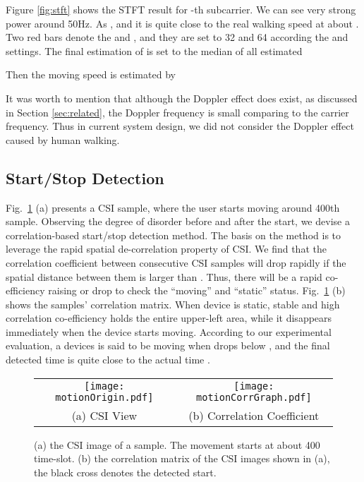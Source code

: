 Figure \ref{fig:stft} shows the STFT result for -th subcarrier.
We can see very strong power around
50Hz. As , and it is quite close to
 the real walking speed at about . Two red bars denote the
 and , and they are set to 32 and 64 according the
 and  settings.
The final estimation of  is set to the median of all estimated 

Then the moving speed   is estimated by


It was worth to mention that although the Doppler effect does exist,
as discussed in Section \ref{sec:related}, the Doppler frequency is
 small comparing to the carrier frequency. Thus in current
system design, we did not consider the Doppler effect caused
by human walking.

\subsection{Start/Stop Detection}



Fig.~\ref{Fig:motionDetection} (a) presents a CSI sample, where the user
starts moving around 400th sample.  Observing the degree of disorder before
and after the start, we devise a correlation-based start/stop detection method.
The basis on the method is to leverage the rapid spatial de-correlation property
of CSI.  We find that the correlation coefficient  between consecutive CSI
samples will drop rapidly if the spatial distance  between them
is larger than  . Thus, there will be a rapid
co-efficiency raising or drop to check the ``moving'' and ``static''
status. Fig.~\ref{Fig:motionDetection} (b) shows the samples'
correlation matrix.
When device is static, stable and high correlation co-efficiency holds
the entire upper-left area, while it disappears immediately when the
device starts moving. According to our
experimental evaluation, a devices is said to be moving when 
drops below , and the final detected time  is quite close to
the actual time .

\begin{figure}[t]
\begin{center}
\begin{tabular}{cc}
\texttt{[image: motionOrigin.pdf]} &
\texttt{[image: motionCorrGraph.pdf]}\\
(a) CSI View & (b) Correlation Coefficient\\
\end{tabular}
\end{center}
\caption { (a)  the CSI image of a sample. The movement starts at about 400
time-slot. (b) the correlation matrix of the CSI images shown in (a), the black
cross denotes the detected start. }
\label{Fig:motionDetection}
\end{figure}


